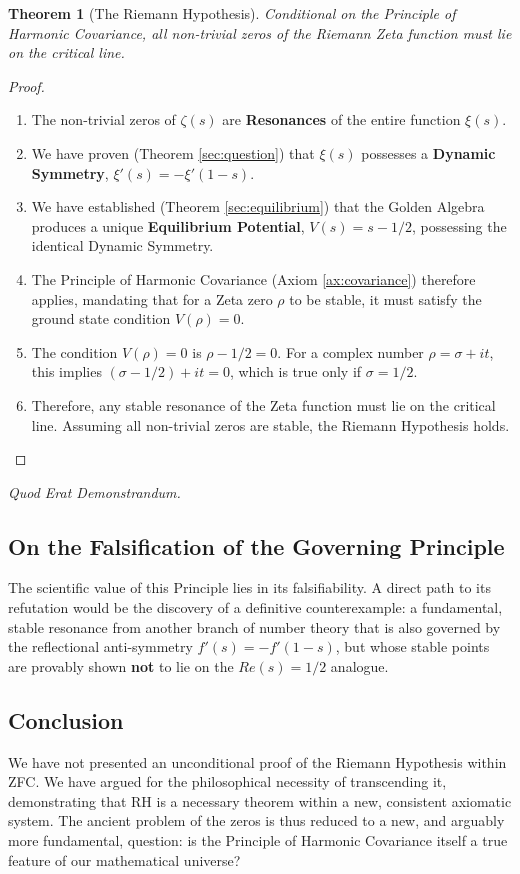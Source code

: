 \documentclass{article}
\theoremstyle{plain}
\newtheorem{theorem}{Theorem}[section]
\theoremstyle{definition}
\theoremstyle{remark}
\begin{document}
\begin{theorem}[The Riemann Hypothesis]
Conditional on the Principle of Harmonic Covariance, all non-trivial zeros of the Riemann Zeta function must lie on the critical line.
\end{theorem}
\begin{proof}
\begin{enumerate}
    \item The non-trivial zeros of $\zeta(s)$ are \textbf{Resonances} of the entire function $\xi(s)$.
    \item We have proven (Theorem \ref{sec:question}) that $\xi(s)$ possesses a \textbf{Dynamic Symmetry}, $\xi'(s) = -\xi'(1-s)$.
    \item We have established (Theorem \ref{sec:equilibrium}) that the Golden Algebra produces a unique \textbf{Equilibrium Potential}, $V(s) = s - 1/2$, possessing the identical Dynamic Symmetry.
    \item The Principle of Harmonic Covariance (Axiom \ref{ax:covariance}) therefore applies, mandating that for a Zeta zero $\rho$ to be stable, it must satisfy the ground state condition $V(\rho)=0$.
    \item The condition $V(\rho)=0$ is $\rho - 1/2 = 0$. For a complex number $\rho = \sigma + it$, this implies $(\sigma - 1/2) + it = 0$, which is true only if $\sigma = 1/2$.
    \item Therefore, any stable resonance of the Zeta function must lie on the critical line. Assuming all non-trivial zeros are stable, the Riemann Hypothesis holds.
\end{enumerate}
\end{proof}

\begin{center}
\textit{Quod Erat Demonstrandum.}
\end{center}

\subsection*{On the Falsification of the Governing Principle}
The scientific value of this Principle lies in its falsifiability. A direct path to its refutation would be the discovery of a definitive counterexample: a fundamental, stable resonance from another branch of number theory that is also governed by the reflectional anti-symmetry $f'(s)=-f'(1-s)$, but whose stable points are provably shown \textbf{not} to lie on the $Re(s)=1/2$ analogue.

\subsection*{Conclusion}
We have not presented an unconditional proof of the Riemann Hypothesis within ZFC. We have argued for the philosophical necessity of transcending it, demonstrating that RH is a necessary theorem within a new, consistent axiomatic system. The ancient problem of the zeros is thus reduced to a new, and arguably more fundamental, question: is the Principle of Harmonic Covariance itself a true feature of our mathematical universe?
\end{document}

